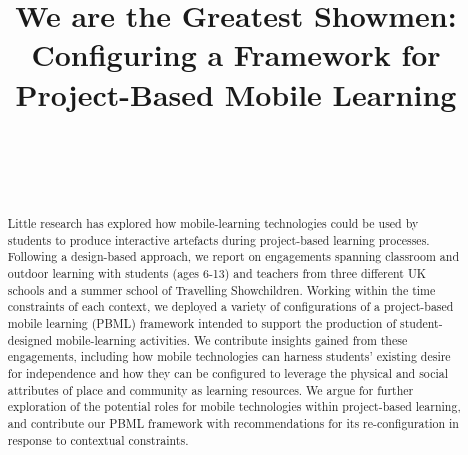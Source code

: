 \documentclass[,hyphens]{sigchi}
\begin{document}
\title{We are the Greatest Showmen: Configuring a Framework for Project-Based Mobile Learning}

\author{%
  \\
  \\
  \\
}

\maketitle

\begin{abstract}
Little research has explored how mobile-learning technologies could be used by students to produce interactive artefacts during project-based learning processes. Following a design-based approach, we report on engagements spanning classroom and outdoor learning with students (ages 6-13) and teachers from three different UK schools and a summer school of Travelling Showchildren. Working within the time constraints of each context, we deployed a variety of configurations of a project-based mobile learning (PBML) framework intended to support the production of student-designed mobile-learning activities. We contribute insights gained from these engagements, including how mobile technologies can harness students' existing desire for independence and how they can be configured to leverage the physical and social attributes of place and community as learning resources. We argue for further exploration of the potential roles for mobile technologies within project-based learning, and contribute our PBML framework with recommendations for its re-configuration in response to contextual constraints.
\end{abstract}


\end{document}
